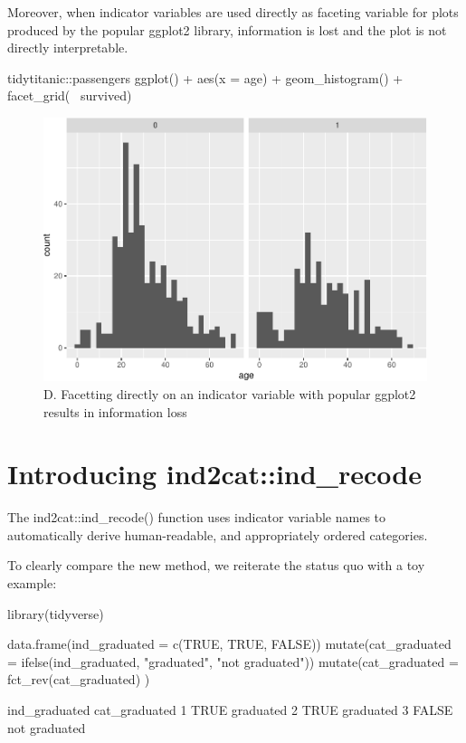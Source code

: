 Moreover, when indicator variables are used directly as faceting
variable for plots produced by the popular ggplot2 library, information
is lost and the plot is not directly interpretable.

\begin{Schunk}
\begin{Sinput}
tidytitanic::passengers %
ggplot() + 
  aes(x = age) + 
  geom_histogram() + 
  facet_grid(~ survived) 
\end{Sinput}
\begin{figure}
\includegraphics[width=0.69\linewidth]{r_journal_files/figure-latex/direct_visual_loss-1} \caption[D]{D. Facetting directly on an indicator variable with popular ggplot2 results in information loss}\label{fig:direct_visual_loss}
\end{figure}
\end{Schunk}

\hypertarget{introducing-ind2catind_recode}{%
\section{Introducing
ind2cat::ind\_recode}\label{introducing-ind2catind_recode}}

The ind2cat::ind\_recode() function uses indicator variable names to
automatically derive human-readable, and appropriately ordered
categories.

To clearly compare the new method, we reiterate the status quo with a
toy example:

\begin{Schunk}
\begin{Sinput}
library(tidyverse)

data.frame(ind_graduated = 
             c(TRUE, TRUE, FALSE))  %
  mutate(cat_graduated  = 
           ifelse(ind_graduated, 
                  "graduated", 
                  "not graduated"))  %
  mutate(cat_graduated = 
           fct_rev(cat_graduated)
         )  
\end{Sinput}
\begin{Soutput}
       ind_graduated cat_graduated
     1          TRUE     graduated
     2          TRUE     graduated
     3         FALSE not graduated
\end{Soutput}
\end{Schunk}

